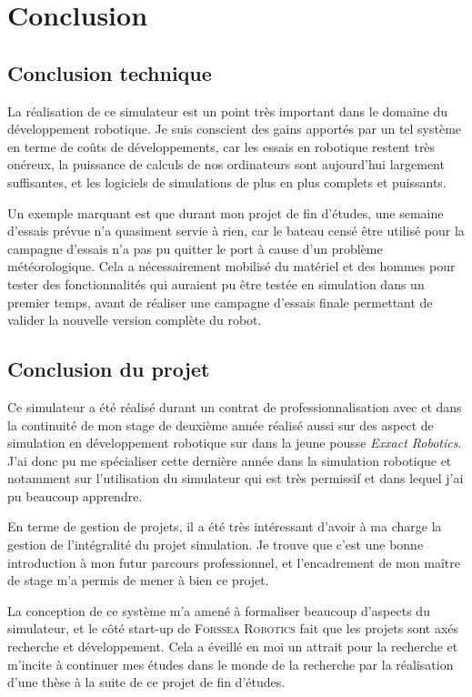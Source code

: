 \chapter{Conclusion}
\label{chapitre:conclusion}
	
	\section{Conclusion technique}

		La réalisation de ce simulateur est un point très important dans le domaine du développement robotique. Je suis conscient des gains apportés par un tel système en terme de coûts de développements, car les essais en robotique restent très onéreux, la puissance de calculs de nos ordinateurs sont aujourd'hui largement suffisantes, et les logiciels de simulations de plus en plus complets et puissants. 
		
		Un exemple marquant est que durant mon projet de fin d'études, une semaine d'essais prévue n'a quasiment servie à rien, car le bateau censé être utilisé pour la campagne d'essais n'a pas pu quitter le port à cause d'un problème météorologique. Cela a nécessairement mobilisé du matériel et des hommes pour tester des fonctionnalités qui auraient pu être testée en simulation dans un premier temps, avant de réaliser une campagne d'essais finale permettant de valider la nouvelle version complète du robot.
	
	\section{Conclusion du projet}

		Ce simulateur a été réalisé durant un contrat de professionnalisation avec \forssea{} et dans la continuité de mon stage de deuxième année réalisé aussi sur des aspect de simulation en développement robotique sur \gazebo{} dans la jeune pousse \textit{Exxact Robotics}. J'ai donc pu me spécialiser cette dernière année dans la simulation robotique et notamment sur l'utilisation du simulateur \gazebo{} qui est très permissif et dans lequel j'ai pu beaucoup apprendre.

		En terme de gestion de projets, il a été très intéressant d'avoir à ma charge la gestion de l'intégralité du projet simulation. Je trouve que c'est une bonne introduction à mon futur parcours professionnel, et l'encadrement de mon maître de stage m'a permis de mener à bien ce projet.

		La conception de ce système m'a amené à formaliser beaucoup d'aspects du simulateur, et le côté start-up de \textsc{Forssea Robotics} fait que les projets sont axés recherche et développement. Cela a éveillé en moi un attrait pour la recherche et m'incite à continuer mes études dans le monde de la recherche par la réalisation d'une thèse à la suite de ce projet de fin d'études.